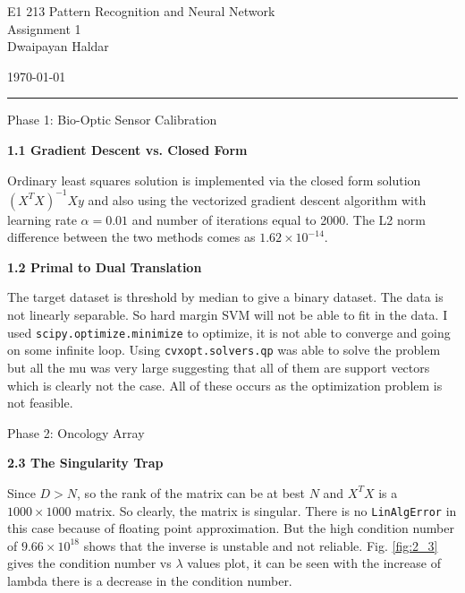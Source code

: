 \documentclass[11pt,a4paper,onecolumn]{exam}
\newcommand{\questionheader}[1]{%
  \begin{tcolorbox}[
    enhanced,
    colback=black,
    coltext=white,
    boxrule=0pt,
    fontupper=\Large\bfseries,
    arc=4mm
  ]
  #1
  \end{tcolorbox}%
}
\begin{document}
\begingroup
    \centering
    \LARGE E1 213 Pattern Recognition and Neural Network\\
    \LARGE Assignment 1\\[0.5em]
    \large Dwaipayan Haldar\par
    \large \today\\[0.5em]
\endgroup
\noindent\rule{\textwidth}{0.5pt}
\printanswers
\renewcommand{\solutiontitle}{\noindent\textbf{Ans:}\enspace}


\questionheader{Phase 1: Bio-Optic Sensor Calibration}

\textbf{1.1 Gradient Descent vs. Closed Form}
\begin{solution}
Ordinary least squares solution is implemented via the closed form solution $(X^TX)^{-1}Xy$ and also using the vectorized gradient descent algorithm with learning rate $\alpha = 0.01$ and number of iterations equal to 2000. The L2 norm difference between the two methods comes as $1.62 \times 10^{-14}$. 
\end{solution}

\textbf{1.2 Primal to Dual Translation}
\begin{solution}
The target dataset is threshold by median to give a binary dataset. The data is not linearly separable. So hard margin SVM will not be able to fit in the data. I used \verb|scipy.optimize.minimize| to optimize, it is not able to converge and going on some infinite loop. Using \verb|cvxopt.solvers.qp| was able to solve the problem but all the mu was very large suggesting that all of them are support vectors which is clearly not the case. All of these occurs as the optimization problem is not feasible. 
\end{solution}

\questionheader{Phase 2: Oncology Array}

\textbf{2.3 The Singularity Trap}
\begin{solution}
Since $D>N$, so the rank of the matrix can be at best $N$ and $X^TX$ is a $1000\times1000$ matrix. So clearly, the matrix is singular. There is no \verb|LinAlgError| in this case because of floating point approximation. But the high condition number of $9.66 \times 10^{18}$ shows that the inverse is unstable and not reliable. Fig. \ref{fig:2_3} gives the condition number vs $\lambda$ values plot, it can be seen with the increase of lambda there is a decrease in the condition number.
\end{solution}
\end{document}
